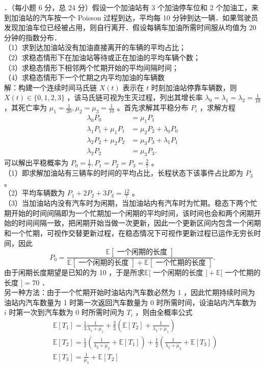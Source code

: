 \documentclass[UTF8,openany]{book}
\begin{document}
．（每小题 6 分，总 24 分）假设一个加油站有 3 个加油停车位和 2 个加油工，来到加油站的汽车按一个 Poisson 过程到达，平均每 10 分钟到达一辆．如果驾驶员发现加油车位已经被占用，则自行离开．假设每辆车加油所需时间服从均值为 20 分钟的指数分布．\\
（1）求到达加油站没有加油直接离开的车辆的平均占比；\\
（2）求稳态情形下在加油站等待或正在加油的平均车辆个数；\\
（3）求稳态情形下相邻两个忙期开始的平均间隔时间；\\
（4）求稳态情形下一个忙期之内平均加油的车辆数\\
解：构建一个连续时间马氏链 $X(t)$ 表示在 $t$ 时刻加油站停靠车辆数，则 $X(t) \in\{0,1,2,3\}$ ，该马氏链可视为生灭过程，列出其增长率 $\lambda_0=\lambda_1=\lambda_2=\frac{1}{10}$ ，其死亡率为 $\mu_1=\frac{1}{20}, \mu_2=\mu_3=\frac{1}{10}$ 。首先求解其平稳分布 $P_i$ ，求解方程\\
$$
\begin{aligned}
	\lambda_0 P_0 & =\mu_1 P_1 \\
	\lambda_1 P_1+\mu_1 P_1 & =\mu_2 P_2+\lambda_0 P_0 \\
	\lambda_2 P_2+\mu_2 P_2 & =\mu_3 P_3+\lambda_1 P_1 \\
	\lambda_2 P_2 & =\mu_3 P_3 .
\end{aligned}
$$
可以解出平稳概率为 $P_0=\frac{1}{7}, P_1=P_2=P_3=\frac{2}{7}$ 。\\
（1）即求解加油站有三辆车的时间的平均占比，长程状态下该事件占比即为 $P_3$ 。\\
（2）平均车辆数为 $P_1+2 P_2+3 P_3=\frac{12}{7}$ 。\\
（3）当加油站内没有汽车时为闲期，当加油站内有汽车时为忙期。稳态下两个忙期开始的时间间隔即为一个忙期加一个闲期的平均时间，该时间也会和两个闲期开始的时间间隔一致，把闲期开始当做一次更新，因此一个更新区间内包含一个闲期和一个忙期，可视作交替更新过程，在稳态情况下可视作更新过程已运作无穷长时间，因此\\
$$
P_0=\frac{\mathbb{E}[\text { 一个闲期的长度 }]}{\mathbb{E}[\text { 一个闲期的长度 }]+\mathbb{E}[\text { 一个忙期的长度 }]} .
$$
由于闲期长度期望是已知的为 10 ，于是所求$\mathbb{E}[$ 一个闲期的长度 $]+\mathbb{E}[$ 一个忙期的长度 $]=70$ ．\\
另一种方法：由于一个忙期开始时油站内汽车数必然为 1 ，因此忙期持续时间为油站内汽车数量为 1 时第一次返回汽车数量为 0 时所需时间，设油站内汽车数为 $i$ 时第一次到汽车数为 0 时所需时间为 $T_i$ ，则由全概率公式\\
$$
\begin{aligned}
	& \mathbb{E} [T_1]=\frac{1}{3} \frac{1}{\lambda_1+\mu_1}+\frac{2}{3}\left(\mathbb{E} [T_2]+\frac{1}{\lambda_1+\mu_1}\right) \\
	& \mathbb{E} [T_2]=\frac{1}{2}\left(\frac{1}{\lambda_2+\mu_2}+\mathbb{E} [T_1]\right)+\frac{1}{2}\left(\frac{1}{\lambda_2+\mu_2}+\mathbb{E} [T_3]\right) \\
	& \mathbb{E} [T_3]=\frac{1}{\mu_3}+\mathbb{E} [T_2]
\end{aligned}
$$
\end{document}
